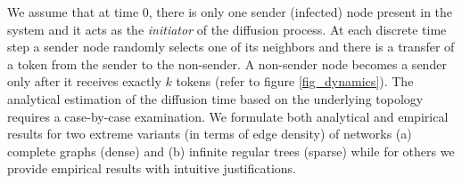 We assume that at time $0$, there is only one sender (infected) node present in the
system and it acts as the {\em initiator} of the diffusion process. At each
discrete time step a sender node randomly selects one of
its neighbors and  there is a transfer of a token from the sender to the non-sender. A non-sender node becomes a sender only after it receives exactly $k$
tokens (refer to figure \ref{fig_dynamics}). 
The analytical
estimation of the diffusion time based on the underlying topology requires a
case-by-case examination.
We formulate both analytical and empirical results for two extreme variants (in terms of edge density) of networks (a) complete graphs (dense) and (b) infinite regular trees (sparse)
while for others we provide empirical
results with intuitive justifications.
\fi
%  


